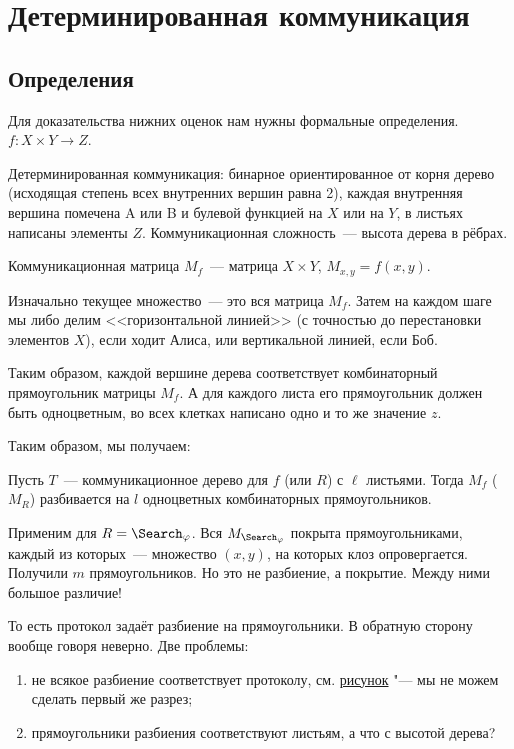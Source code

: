 \section{Детерминированная коммуникация}

\subsection{Определения}

Для доказательства нижних оценок нам нужны формальные определения. $f\colon X\times Y\to Z$.

Детерминированная коммуникация: бинарное ориентированное от корня дерево (исходящая степень всех
внутренних вершин равна 2), каждая внутренняя вершина помечена A или B и булевой функцией на $X$ или на
$Y$, в листьях написаны элементы $Z$.  
Коммуникационная сложность~--- высота дерева в рёбрах.

Коммуникационная матрица $M_f$~--- матрица $X \times Y$, $M_{x, y} = f(x, y)$.

Изначально текущее множество~--- это вся матрица $M_f$. Затем на каждом шаге мы либо делим
<<горизонтальной линией>> (с точностью до перестановки элементов $X$), если ходит Алиса, или вертикальной
линией, если Боб.

Таким образом, каждой вершине дерева соответствует комбинаторный прямоугольник матрицы $M_f$. А для
каждого листа его прямоугольник должен быть одноцветным, во всех клетках написано одно и то же значение
$z$.

Таким образом, мы получаем:

\begin{theorem}
    \label{th:first}
    Пусть $T$~--- коммуникационное дерево для $f$ (или $R$) с $\ell$ листьями. Тогда $M_f$ ($M_R$)
    разбивается на $l$ одноцветных комбинаторных прямоугольников.
\end{theorem}

Применим для $R = \Search_{\varphi}$. Вся $M_{\Search_{\varphi}}$ покрыта прямоугольниками, каждый из
которых~--- множество $(x, y)$, на которых клоз опровергается. Получили $m$ прямоугольников. Но это не
разбиение, а покрытие. Между ними большое различие!


То есть протокол задаёт разбиение на прямоугольники. В обратную сторону вообще говоря неверно.
Две проблемы:
\begin{enumerate}
    \item \label{itm:problem partition-to-protocol} не всякое разбиение соответствует протоколу,
        см. \href{https://youtu.be/OoUD-zF_5ZE?t=1755}{рисунок} "--- мы не можем сделать первый же
        разрез;
    \item \label{itm:problem leaves-to-cc} прямоугольники разбиения соответствуют листьям, а что с
        высотой дерева?
\end{enumerate}

